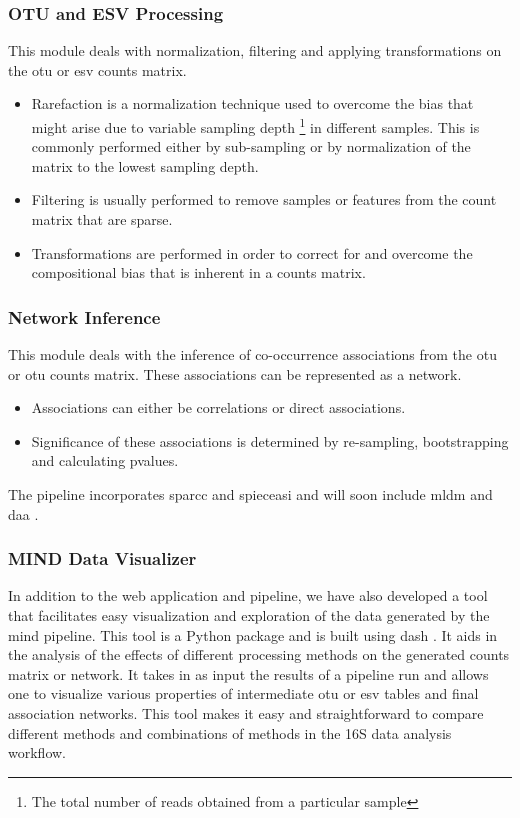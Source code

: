  \subsubsection*{OTU and ESV Processing}
    \vspace{-5mm}
    This module deals with normalization, filtering and applying transformations on the \ac{otu} or \ac{esv} counts matrix.
    \begin{itemize}
      \item Rarefaction is a normalization technique used to overcome the bias that might arise due to variable sampling depth \footnote{The total number of reads obtained from a particular sample} in different samples. This is commonly performed either by sub-sampling or by normalization of the matrix to the lowest sampling depth.
      \item Filtering is usually performed to remove samples or features from the count matrix that are sparse.
      \item Transformations are performed in order to correct for and overcome the compositional bias that is inherent in a counts matrix.
    \end{itemize}

  \subsubsection*{Network Inference}
    \vspace{-5mm}
    This module deals with the inference of co-occurrence associations from the \ac{otu} or \ac{otu} counts matrix. These associations can be represented as a network.
    \begin{itemize}
      \item Associations can either be correlations or direct associations.
      \item Significance of these associations is determined by re-sampling, bootstrapping and calculating pvalues.
    \end{itemize}
    The pipeline incorporates \ac{sparcc} \cite{Friedman2012} and \ac{spieceasi} \cite{Kurtz2015} and will soon include \ac{mldm} \cite{Yang2017} and \ac{daa} \cite{Menon2018}.

  \subsubsection*{MIND Data Visualizer}

    In addition to the web application and pipeline, we have also developed a tool that facilitates easy visualization and exploration of the data generated by the \ac{mind} pipeline.
    This tool is a Python package and is built using dash \cite{dash}.
    It aids in the analysis of the effects of different processing methods on the generated counts matrix or network.
    It takes in as input the results of a pipeline run and allows one to visualize various properties of intermediate \ac{otu} or \ac{esv} tables and final association networks.
    This tool makes it easy and straightforward to compare different methods and combinations of methods in the 16S data analysis workflow.

